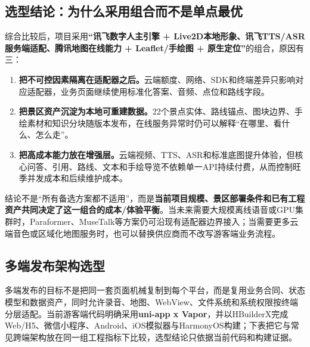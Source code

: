 \subsection{选型结论：为什么采用组合而不是单点最优}

综合比较后，项目采用\textbf{“讯飞数字人主引擎 + Live2D本地形象、讯飞TTS/ASR服务端适配、腾讯地图在线能力 + Leaflet/手绘图 + 原生定位”}的组合，原因有三：

\begin{enumerate}
  \item \textbf{把不可控因素隔离在适配器之后。}云端额度、网络、SDK和终端差异只影响对应适配器，业务页面继续使用标准化答案、音频、点位和路线字段。
  \item \textbf{把景区资产沉淀为本地可重建数据。}22个景点实体、路线锚点、图块边界、手绘素材和知识分块随版本发布，在线服务异常时仍可以解释“在哪里、看什么、怎么走”。
  \item \textbf{把高成本能力放在增强层。}云端视频、TTS、ASR和标准底图提升体验，但核心问答、引用、路线、文本和手绘导览不依赖单一API持续付费，从而控制旺季并发成本和后续维护成本。
\end{enumerate}

结论不是“所有备选方案都不适用”，而是\textbf{当前项目规模、景区部署条件和已有工程资产共同决定了这一组合的成本/体验平衡}。当未来需要大规模离线语音或GPU集群时，Paraformer、MuseTalk等方案仍可沿现有适配器边界接入；当需要更多云端音色或区域化地图服务时，也可以替换供应商而不改写游客端业务流程。

\subsection{多端发布架构选型}

多端发布的目标不是把同一套页面机械复制到每个平台，而是复用业务合同、状态模型和数据资产，同时允许录音、地图、WebView、文件系统和系统权限按终端分层适配。当前游客端代码明确采用\textbf{uni-app x Vapor}，并以HBuilderX完成Web/H5、微信小程序、Android、iOS模拟器与HarmonyOS构建；下表把它与常见跨端架构放在同一组工程指标下比较，选型结论只依据当前代码和构建证据。

